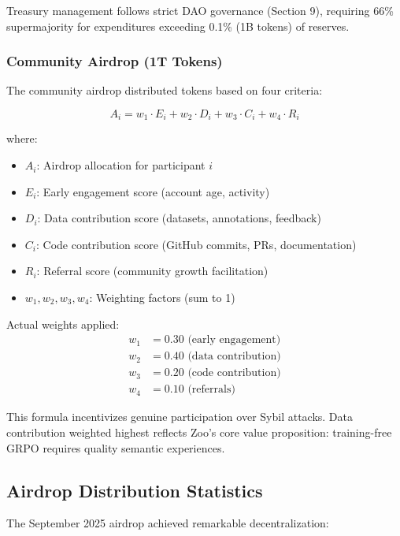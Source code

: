 Treasury management follows strict DAO governance (Section 9), requiring 66\% supermajority for expenditures exceeding 0.1\% (1B tokens) of reserves.

\subsubsection{Community Airdrop (1T Tokens)}

The community airdrop distributed tokens based on four criteria:

\begin{equation}
A_i = w_1 \cdot E_i + w_2 \cdot D_i + w_3 \cdot C_i + w_4 \cdot R_i
\end{equation}

where:
\begin{itemize}
\item $A_i$: Airdrop allocation for participant $i$
\item $E_i$: Early engagement score (account age, activity)
\item $D_i$: Data contribution score (datasets, annotations, feedback)
\item $C_i$: Code contribution score (GitHub commits, PRs, documentation)
\item $R_i$: Referral score (community growth facilitation)
\item $w_1, w_2, w_3, w_4$: Weighting factors (sum to 1)
\end{itemize}

Actual weights applied:
\begin{align}
w_1 &= 0.30 \text{ (early engagement)} \\
w_2 &= 0.40 \text{ (data contribution)} \\
w_3 &= 0.20 \text{ (code contribution)} \\
w_4 &= 0.10 \text{ (referrals)}
\end{align}

This formula incentivizes genuine participation over Sybil attacks. Data contribution weighted highest reflects Zoo's core value proposition: training-free GRPO requires quality semantic experiences.

\subsection{Airdrop Distribution Statistics}

The September 2025 airdrop achieved remarkable decentralization:

